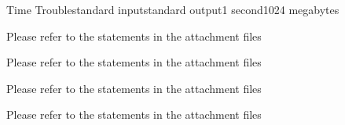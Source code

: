 \begin{problem}{Time Trouble}{standard input}{standard output}{1 second}{1024 megabytes}

Please refer to the statements in the attachment files

\InputFile
Please refer to the statements in the attachment files

\OutputFile
Please refer to the statements in the attachment files

\Example

\begin{example}
%
\end{example}

\Note
Please refer to the statements in the attachment files

\end{problem}


